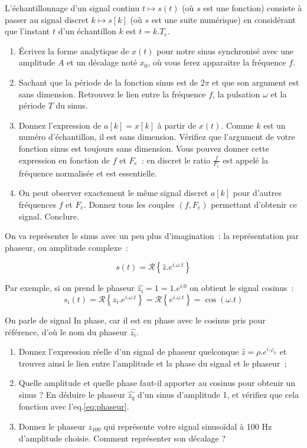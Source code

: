 \documentclass[a4paper,twoside,12pt]{report}           %
\begin{document}
L'échantillonnage d'un signal continu $t\mapsto s(t)$ (où $s$ est une
fonction) consiste à passer au signal discret $k \mapsto s[k]$ (où $s$
est une suite numérique) en considérant que l'instant $t$ d'un
échantillon $k$ est $t=k.T_e$.
\begin{enumerate}
\item \'Ecrivez la forme analytique de $x(t)$ pour notre sinus
  synchronisé avec une amplitude $A$ et un décalage noté $x_0$, où
  vous ferez apparaitre la fréquence $f$.
\item Sachant que la période de la fonction sinus est de $2\pi$ et que
  son argument est sans dimension. Retrouvez le lien entre la
  fréquence $f$, la pulsation $\omega$ et la période $T$ du sinus.
\item Donnez l'expression de $a[k]=x[k]$ à partir de $x(t)$. Comme $k$
  est un numéro d'échantillon, il est sans dimension. Vérifiez que
  l'argument de votre fonction sinus est toujours sans dimension. Vous
  pouvez donner cette expression en fonction de $f$ et $F_e$~: en
  discret le ratio $\frac{f}{F_e}$ est appelé la fréquence normalisée
  et est essentielle.
\item On peut observer exactement le même signal discret $a[k]$ pour
  d'autres fréquences $f$ et $F_e$. Donnez tous les couples $(f,F_e)$
  permettant d'obtenir ce signal. Conclure.
\end{enumerate}

On va représenter le sinus avec un peu plus d'imagination~: la
représentation par phaseur, ou amplitude complexe~:

\begin{equation}
  \label{eq:phaseur}
  s(t) = \mathcal{R}\left\{\hat{z}.e^{i.\omega.t}\right\}
\end{equation}

Par exemple, si on prend le phaseur $\hat{z_i}=1 = 1.e^{i.0}$ on
obtient le signal cosinus~:
\begin{equation}
  \label{eq:Zi}
  s_i(t) = \mathcal{R}\left\{z_i.e^{i.\omega.t}\right\} = \mathcal{R}\left\{e^{i.\omega.t}\right\}=\cos(\omega.t)
\end{equation}


On parle de signal \og{} In phase\fg{}, car il est en phase avec le
cosinus pris pour référence, d'où le nom du phaseur $\hat{z_i}$.

\begin{enumerate}
\item Donnez l'expression réelle d'un signal de phaseur quelconque
  $\hat{z}=\rho.e^{i.\varphi_0}$ et trouvez ainsi le lien entre
  l'amplitude et la phase du signal et le phaseur~;
\item Quelle amplitude et quelle phase faut-il apporter au cosinus
  pour obtenir un sinus ?  En déduire le phaseur $\hat{z_q}$ d'un
  sinus d'amplitude 1, et vérifiez que cela fonction avec
  l'eq.\ref{eq:phaseur}.
\item Donnez le phaseur $z_{100}$ qui représente votre signal
  sinusoïdal à 100 Hz d'amplitude choisie. Comment représenter son
  décalage ?
\end{enumerate}
\end{document}
